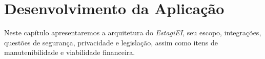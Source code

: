 \chapter{Desenvolvimento da Aplicação}
Neste capítulo apresentaremos a arquitetura do \emph{EstagiEI}, seu escopo, integrações, questões de segurança, privacidade e legislação, assim como itens de manutenibilidade e viabilidade financeira.






%



%




